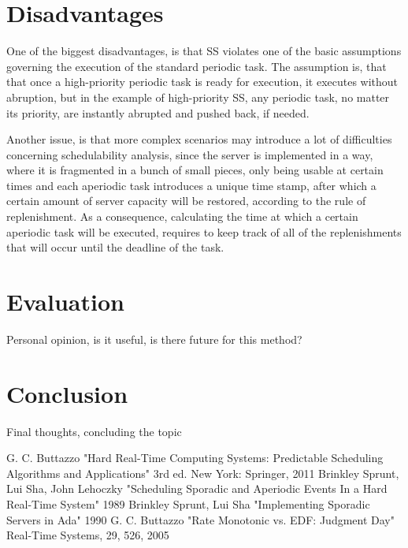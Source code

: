 \documentclass[conference]{IEEEtran}
\begin{document}
\section{Disadvantages}
One of the biggest disadvantages, is that SS violates one of the basic assumptions governing the execution of the standard periodic task. The assumption is, that that once a high-priority periodic task is ready for execution, it executes without abruption, but in the example of high-priority SS, any periodic task, no matter its priority, are instantly abrupted and pushed back, if needed.

Another issue, is that more complex scenarios may introduce a lot of difficulties concerning schedulability analysis, since the server is implemented in a way, where it is fragmented in a bunch of small pieces, only being usable at certain times and each aperiodic task introduces a unique time stamp, after which a certain amount of server capacity will be restored, according to the rule of replenishment. As a consequence, calculating the time at which a certain aperiodic task will be executed, requires to keep track of all of the replenishments that will occur until the deadline of the task.

\section{Evaluation}
Personal opinion, is it useful, is there future for this method?

\section{Conclusion}
Final thoughts, concluding the topic

\begin{thebibliography}{00}
 G. C. Buttazzo "Hard Real-Time Computing Systems: Predictable Scheduling Algorithms and Applications" 3rd ed. New York: Springer, 2011
 Brinkley Sprunt, Lui Sha, John Lehoczky "Scheduling Sporadic and Aperiodic Events In a Hard Real-Time System" 1989
 Brinkley Sprunt, Lui Sha "Implementing Sporadic Servers in Ada" 1990
 G. C. Buttazzo "Rate Monotonic vs. EDF: Judgment Day" Real-Time Systems, 29, 526, 2005

\end{thebibliography}
\end{document}
